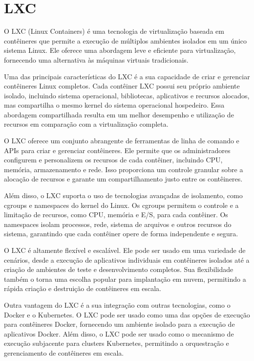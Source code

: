 \section{LXC}

O LXC (Linux Containers) é uma tecnologia de virtualização baseada em contêineres que permite a execução de múltiplos ambientes isolados em um único sistema Linux. Ele oferece uma abordagem leve e eficiente para virtualização, fornecendo uma alternativa às máquinas virtuais tradicionais.

Uma das principais características do LXC é a sua capacidade de criar e gerenciar contêineres Linux completos. Cada contêiner LXC possui seu próprio ambiente isolado, incluindo sistema operacional, bibliotecas, aplicativos e recursos alocados, mas compartilha o mesmo kernel do sistema operacional hospedeiro. Essa abordagem compartilhada resulta em um melhor desempenho e utilização de recursos em comparação com a virtualização completa.

O LXC oferece um conjunto abrangente de ferramentas de linha de comando e APIs para criar e gerenciar contêineres. Ele permite que os administradores configurem e personalizem os recursos de cada contêiner, incluindo CPU, memória, armazenamento e rede. Isso proporciona um controle granular sobre a alocação de recursos e garante um compartilhamento justo entre os contêineres.

Além disso, o LXC suporta o uso de tecnologias avançadas de isolamento, como cgroups e namespaces do kernel do Linux. Os cgroups permitem o controle e a limitação de recursos, como CPU, memória e E/S, para cada contêiner. Os namespaces isolam processos, rede, sistema de arquivos e outros recursos do sistema, garantindo que cada contêiner opere de forma independente e segura.

O LXC é altamente flexível e escalável. Ele pode ser usado em uma variedade de cenários, desde a execução de aplicativos individuais em contêineres isolados até a criação de ambientes de teste e desenvolvimento completos. Sua flexibilidade também o torna uma escolha popular para implantação em nuvem, permitindo a rápida criação e destruição de contêineres em escala.

Outra vantagem do LXC é a sua integração com outras tecnologias, como o Docker e o Kubernetes. O LXC pode ser usado como uma das opções de execução para contêineres Docker, fornecendo um ambiente isolado para a execução de aplicativos Docker. Além disso, o LXC pode ser usado como o mecanismo de execução subjacente para clusters Kubernetes, permitindo a orquestração e gerenciamento de contêineres em escala.